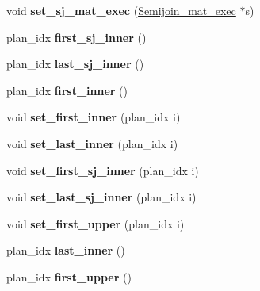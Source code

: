 \begin{DoxyCompactItemize}
\mbox{\label{classQEP__shared_af66a00f0e208a1ab8be90852a22fb31c}} 
void {\bfseries set\+\_\+sj\+\_\+mat\+\_\+exec} (\mbox{\hyperlink{classSemijoin__mat__exec}{Semijoin\+\_\+mat\+\_\+exec}} $\ast$s)
\item 
\mbox{\label{classQEP__shared_a438247e6c745045d01e63be2f02faa3d}} 
plan\+\_\+idx {\bfseries first\+\_\+sj\+\_\+inner} ()
\item 
\mbox{\label{classQEP__shared_ad2943ad679cb1ba17e66e3f50b3ad606}} 
plan\+\_\+idx {\bfseries last\+\_\+sj\+\_\+inner} ()
\item 
\mbox{\label{classQEP__shared_a376c4b625e0629563467ea6769630f16}} 
plan\+\_\+idx {\bfseries first\+\_\+inner} ()
\item 
\mbox{\label{classQEP__shared_a7210260b45525290679e4b0ff17e4969}} 
void {\bfseries set\+\_\+first\+\_\+inner} (plan\+\_\+idx i)
\item 
\mbox{\label{classQEP__shared_afa145a24a29f52f41a1fcd63d29b5b27}} 
void {\bfseries set\+\_\+last\+\_\+inner} (plan\+\_\+idx i)
\item 
\mbox{\label{classQEP__shared_a2e3db75494df8c577705839d70fe8f07}} 
void {\bfseries set\+\_\+first\+\_\+sj\+\_\+inner} (plan\+\_\+idx i)
\item 
\mbox{\label{classQEP__shared_a2abc0b2ef34fcbd9b1bad99ebb7c6c6d}} 
void {\bfseries set\+\_\+last\+\_\+sj\+\_\+inner} (plan\+\_\+idx i)
\item 
\mbox{\label{classQEP__shared_acc2bd2b4000c98631dd19aee33795354}} 
void {\bfseries set\+\_\+first\+\_\+upper} (plan\+\_\+idx i)
\item 
\mbox{\label{classQEP__shared_ac8162e3ae4b607a36a36297901c9a1ac}} 
plan\+\_\+idx {\bfseries last\+\_\+inner} ()
\item 
\mbox{\label{classQEP__shared_ae9f62349666bde14ebb9d6db27b0b188}} 
plan\+\_\+idx {\bfseries first\+\_\+upper} ()

\end{DoxyCompactItemize}
